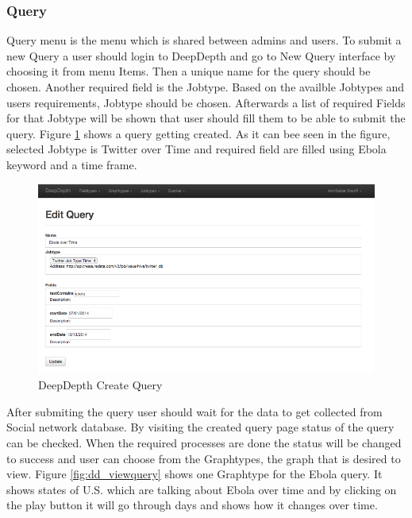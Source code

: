 \documentclass[a4paper,11pt]{report}
\begin{document}
\subsubsection{Query}

Query menu is the menu which is shared between admins and users. To submit a new Query a user should login to DeepDepth and go to New Query interface by choosing it from menu Items. Then a unique name for the query should be chosen. Another required field is the Jobtype. Based on the availble Jobtypes and users requirements, Jobtype should be chosen. Afterwards a list of required Fields for that Jobtype will be shown that user should fill them to be able to submit the query. Figure \ref{fig:dd_editcreatequery} shows a query getting created. As it can bee seen in the figure, selected Jobtype is Twitter over Time and required field are filled using Ebola keyword and a time frame.

\begin{figure}[H!]
\begin{center}
\includegraphics[scale=0.5]{dd_editcreatequery.png}
\end{center}
\caption{DeepDepth Create Query}
\label{fig:dd_editcreatequery}
\end{figure}

After submiting the query user should wait for the data to get collected from Social network database. By visiting the created query page status of the query can be checked. When the required processes are done the status will be changed to success and user can choose from the Graphtypes, the graph that is desired to view. Figure \ref{fig:dd_viewquery} shows one Graphtype for the Ebola query. It shows states of U.S. which are talking about Ebola over time and by clicking on the play button it will go through days and shows how it changes over time.
\end{document}
